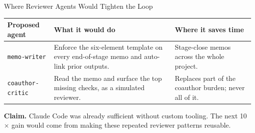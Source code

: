 \documentclass[10pt,english,aspectratio=169]{beamer}
\begin{document}
\begin{frame}{Where Reviewer Agents Would Tighten the Loop}
\scriptsize
\begin{tabular}{p{3.0cm}p{4.4cm}p{4.6cm}}
\toprule
\textbf{Proposed agent} & \textbf{What it would do} & \textbf{Where it saves time} \\
\midrule
\texttt{memo-writer} & Enforce the six-element template on every end-of-stage memo and auto-link prior outputs. & Stage-close memos across the whole project. \\
\texttt{coauthor-critic} & Read the memo and surface the top missing checks, as a simulated reviewer. & Replaces part of the coauthor burden; never all of it. \\
\bottomrule
\end{tabular}

\vspace{0.16cm}
\begin{tcolorbox}[colback=blue!3,colframe=RedTitle!60]\scriptsize
\textbf{Claim.} Claude Code was already sufficient without custom tooling. The next 10$\times$ gain would come from making these repeated reviewer patterns reusable.
\end{tcolorbox}
\end{frame}
\end{document}

